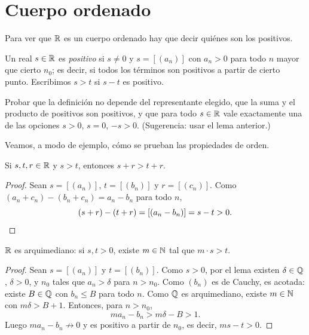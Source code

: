\section{Cuerpo ordenado}

Para ver que \(\mathbb{R}\) es un cuerpo ordenado hay que decir quiénes son los positivos.

\begin{definition}
  Un real \(s \in \mathbb{R}\) es \emph{positivo} si \(s \neq 0\) y \(s = [(a_n)]\) con \(a_n > 0\) para todo \(n\) mayor que cierto \(n_0\); es decir, si todos los términos son positivos a partir de cierto punto. Escribimos \(s > t\) si \(s - t\) es positivo.
\end{definition}

\begin{ejercicio}
  Probar que la definición no depende del representante elegido, que la suma y el producto de positivos son positivos, y que para todo \(s \in \mathbb{R}\) vale exactamente una de las opciones \(s > 0\), \(s = 0\), \(-s > 0\). (Sugerencia: usar el lema anterior.)
\end{ejercicio}

Veamos, a modo de ejemplo, cómo se prueban las propiedades de orden.

\begin{theorem}
  Si \(s, t, r \in \mathbb{R}\) y \(s > t\), entonces \(s + r > t + r\).
\end{theorem}

\begin{proof}
  Sean \(s = [(a_n)]\), \(t = [(b_n)]\) y \(r = [(c_n)]\). Como \((a_n + c_n) - (b_n + c_n) = a_n - b_n\) para todo \(n\),
  \[
    (s + r) - (t + r) = [(a_n - b_n)] = s - t > 0. \qedhere
  \]
\end{proof}

\begin{theorem}
  \(\mathbb{R}\) es arquimediano: si \(s, t > 0\), existe \(m \in \mathbb{N}\) tal que \(m \cdot s > t\).
\end{theorem}

\begin{proof}
  Sean \(s = [(a_n)]\) y \(t = [(b_n)]\). Como \(s > 0\), por el lema existen \(\delta \in \mathbb{Q}\), \(\delta > 0\), y \(n_0\) tales que \(a_n > \delta\) para \(n > n_0\). Como \((b_n)\) es de Cauchy, es acotada: existe \(B \in \mathbb{Q}\) con \(b_n \leq B\) para todo \(n\). Como \(\mathbb{Q}\) es arquimediano, existe \(m \in \mathbb{N}\) con \(m \delta > B + 1\). Entonces, para \(n > n_0\),
  \[
    m a_n - b_n > m \delta - B > 1.
  \]
  Luego \(m a_n - b_n \not\to 0\) y es positivo a partir de \(n_0\), es decir, \(m s - t > 0\).
\end{proof}

